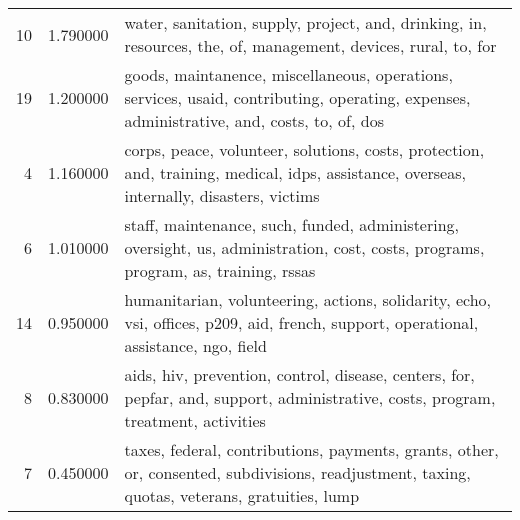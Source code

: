 \begin{table}
\begin{tabular}{rrl}
10 & 1.790000 & water, sanitation, supply, project, and, drinking, in, resources, the, of, management, devices, rural, to, for \\
19 & 1.200000 & goods, maintanence, miscellaneous, operations, services, usaid, contributing, operating, expenses, administrative, and, costs, to, of, dos \\
4 & 1.160000 & corps, peace, volunteer, solutions, costs, protection, and, training, medical, idps, assistance, overseas, internally, disasters, victims \\
6 & 1.010000 & staff, maintenance, such, funded, administering, oversight, us, administration, cost, costs, programs, program, as, training, rssas \\
14 & 0.950000 & humanitarian, volunteering, actions, solidarity, echo, vsi, offices, p209, aid, french, support, operational, assistance, ngo, field \\
8 & 0.830000 & aids, hiv, prevention, control, disease, centers, for, pepfar, and, support, administrative, costs, program, treatment, activities \\
7 & 0.450000 & taxes, federal, contributions, payments, grants, other, or, consented, subdivisions, readjustment, taxing, quotas, veterans, gratuities, lump \\
\bottomrule
\end{tabular}
\end{table}
